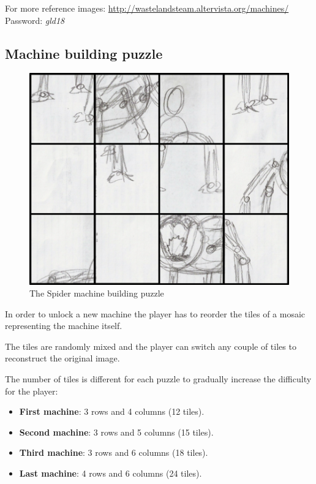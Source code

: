 For more reference images: \url{http://wastelandsteam.altervista.org/machines/}\\
Password: \textit{gld18}

\subsection{Machine building puzzle}
\begin{figure}[H]
  \centering
  \includegraphics[width=\textwidth]{Images/Puzzles/castleOfDynamia1}
  \caption{The Spider machine building puzzle}
\end{figure}

In order to unlock a new machine the player has to reorder the tiles of a mosaic representing the machine itself.

The tiles are randomly mixed and the player can switch any couple of tiles to reconstruct the original image.

The number of tiles is different for each puzzle to gradually increase the difficulty for the player:
\begin{itemize}
	\item \textbf{First machine}: 3 rows and 4 columns (12 tiles).
	\item \textbf{Second machine}: 3 rows and 5 columns (15 tiles).
	\item \textbf{Third machine}: 3 rows and 6 columns (18 tiles).
	\item \textbf{Last machine}: 4 rows and 6 columns (24 tiles).
\end{itemize}

